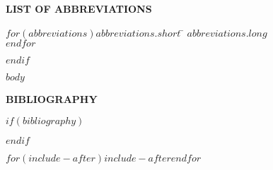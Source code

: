 \documentclass[$if(fontsize)$$fontsize$,$endif$,letterpaper,twoside]{report}
\begin{document}
\begin{center}
{\normalsize \textbf{LIST OF ABBREVIATIONS}}
\end{center}

\newcommand{\Ab}[2]{\noindent  #1 \> #2 \\}
\newcommand{\Abi}[2]{\noindent #1 \hspace{1.5cm} \= #2 \\}

\begin{tabbing}
$for(abbreviations)$\Abi{$abbreviations.short$}{$abbreviations.long$}$endfor$
\end{tabbing}

\clearpage
$endif$



$body$



\clearpage
{}

{\def\chapter*#1{} %
\begin{singlespace}
\begin{center}
\normalsize \textbf{BIBLIOGRAPHY}
\vspace{17pt}
\end{center}


$if(bibliography)$

$endif$
\end{singlespace}
}

$for(include-after)$$include-after$$endfor$
\end{document}
